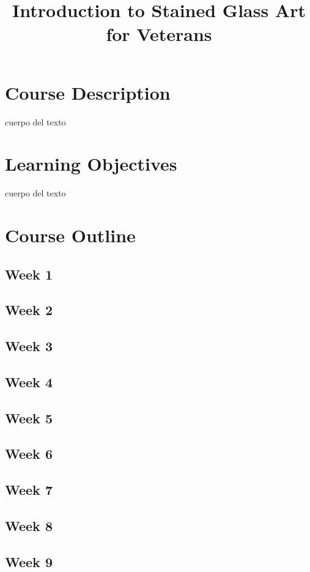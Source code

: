 \documentclass[11pt]{article}
\title{Introduction to Stained Glass Art for Veterans}
\date{}
\begin{document}
    \maketitle

    \section*{Course Description}
    cuerpo del texto

    \section*{Learning Objectives}
    cuerpo del texto

    \section*{Course Outline}
    \subsection*{Week 1}

    \subsection*{Week 2}
    \subsection*{Week 3}
    \subsection*{Week 4}
    \subsection*{Week 5}
    \subsection*{Week 6}
    \subsection*{Week 7}
    \subsection*{Week 8}
    \subsection*{Week 9}
\end{document}
